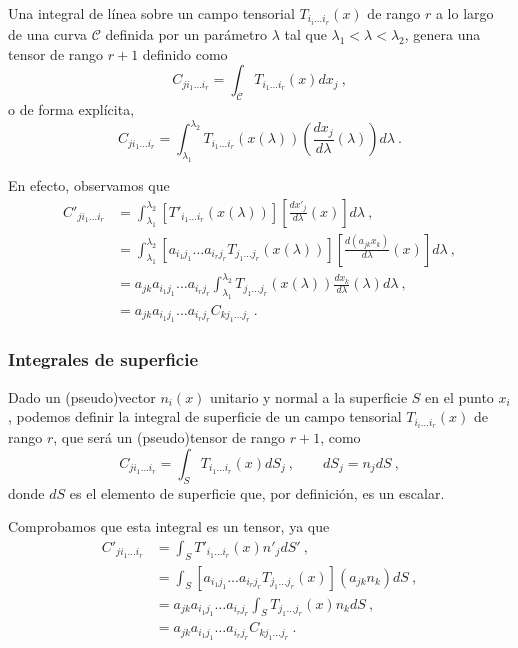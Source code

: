 Una integral de línea sobre un campo tensorial $T_{i_i \dots i_r}(x)$ de rango $r$ a lo largo de una curva $\mathcal{C}$ definida por un parámetro $\lambda$ tal que $\lambda_1 < \lambda < \lambda_2$, genera una tensor de rango $r+1$ definido como
\begin{equation}
    C_{j i_1 \dots i_r} = \int_{\mathcal{C}} T_{i_1 \dots i_r} (x) dx_j \ ,
\end{equation}
o de forma explícita,
\begin{equation}
    C_{j i_1 \dots i_r} =  \int_{\lambda_1}^{\lambda_2} T_{i_1 \dots i_r}(x(\lambda)) \left(\frac{dx_j}{d\lambda}(\lambda) \right) d\lambda \ .
\end{equation}

En efecto, observamos que
\begin{align}
    C'_{j i_1 \dots i_r} & = \int_{\lambda_1}^{\lambda_2} [T'_{i_1 \dots i_r}(x(\lambda))] \left[ \frac{dx'_j}{d\lambda}(x) \right] d\lambda \ , \\
    & = \int_{\lambda_1}^{\lambda_2} [a_{i_1 j_1} \dots a_{i_r j_r} T_{j_1 \dots j_r}(x(\lambda))] \left[ \frac{d(a_{jk}x_k)}{d\lambda}(x) \right] d\lambda \ , \\
    & = a_{jk} a_{i_1 j_1} \dots a_{i_r j_r} \int_{\lambda_1}^{\lambda_2} T_{j_1 \dots j_r}(x(\lambda)) \frac{dx_k}{d\lambda}(\lambda) d\lambda \ , \\
    & = a_{jk} a_{i_1 j_1} \dots a_{i_r j_r} C_{k j_1 \dots j_r} \ .
\end{align}

\subsubsection*{Integrales de superficie}

Dado un (pseudo)vector $n_i(x)$ unitario y normal a la superficie $S$ en el punto $x_i$, podemos definir la integral de superficie de un campo tensorial $T_{i_i \dots i_r}(x)$ de rango $r$, que será un (pseudo)tensor de rango $r+1$, como
\begin{equation}
    C_{j i_1 \dots i_r} = \int_S T_{i_1 \dots i_r} (x) dS_j \ , \qquad dS_j = n_j dS \ ,
\end{equation}
donde $dS$ es el elemento de superficie que, por definición, es un escalar.

Comprobamos que esta integral es un tensor, ya que
\begin{align}
    C'_{j i_1 \dots i_r} & = \int_S T'_{i_1 \dots i_r}(x) n'_j dS' \ , \\
    & = \int_S [a_{i_1 j_1} \dots a_{i_r j_r} T_{j_1 \dots j_r}(x)](a_{jk} n_k) dS \ , \\
    & = a_{jk} a_{i_1 j_1} \dots a_{i_r j_r} \int_S T_{j_1 \dots j_r}(x) n_k dS \ , \\
    & = a_{jk} a_{i_1 j_1} \dots a_{i_r j_r} C_{k j_1 \dots j_r} \ .
\end{align}

